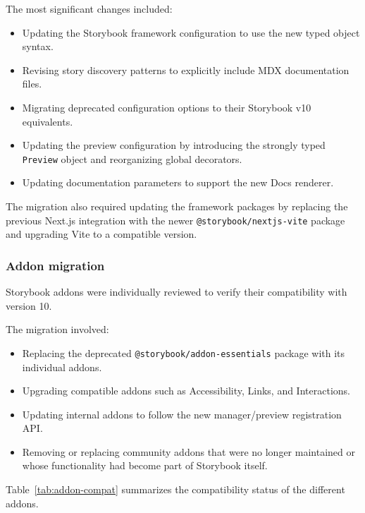 The most significant changes included:

\begin{itemize}
    \item Updating the Storybook framework configuration to use the new typed object syntax.
    \item Revising story discovery patterns to explicitly include MDX documentation files.
    \item Migrating deprecated configuration options to their Storybook v10 equivalents.
    \item Updating the preview configuration by introducing the strongly typed \lstinline|Preview| object and reorganizing global decorators.
    \item Updating documentation parameters to support the new Docs renderer.
\end{itemize}

The migration also required updating the framework packages by replacing the previous Next.js integration with the newer \lstinline|@storybook/nextjs-vite| package and upgrading Vite to a compatible version.

\subsubsection{Addon migration}

Storybook addons were individually reviewed to verify their compatibility with version 10.

The migration involved:

\begin{itemize}
    \item Replacing the deprecated \lstinline|@storybook/addon-essentials| package with its individual addons.
    \item Upgrading compatible addons such as Accessibility, Links, and Interactions.
    \item Updating internal addons to follow the new manager/preview registration API.
    \item Removing or replacing community addons that were no longer maintained or whose functionality had become part of Storybook itself.
\end{itemize}

Table~\ref{tab:addon-compat} summarizes the compatibility status of the different addons.

